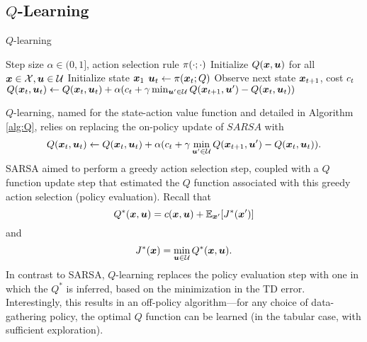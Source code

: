 \subsection{$Q$-Learning}

\begin{algorithm}[t]
\caption{$Q$-learning}
\centering
\label{alg:Q}

\begin{algorithmic}[1]
    \Require Step size $\alpha \in (0,1]$, action selection rule $\pi(\cdot; \cdot)$
    \State Initialize $Q(\bm{x},\bm{u})$ for all $\bm{x} \in \mathcal{X}, \bm{u} \in \mathcal{U}$
        \State Initialize state $\bm{x}_1$
            \State $\bm{u}_t \gets \pi(\bm{x}_t; Q)$
            \State Observe next state $\bm{x}_{t+1}$, cost $c_{t}$
            \State $Q(\bm{x}_t,\bm{u}_t) \gets Q(\bm{x}_t,\bm{u}_t) + \alpha (c_t + \gamma \min_{\bm{u}' \in \mathcal{U}} Q(\bm{x}_{t+1},\bm{u}') - Q(\bm{x}_t,\bm{u}_t))$
        \EndFor
    \EndFor
\end{algorithmic}
\end{algorithm}

$Q$-learning, named for the state-action value function and detailed in Algorithm \ref{alg:Q}, relies on replacing the on-policy update of $SARSA$ with 
\begin{equation}
    Q(\bm{x}_t,\bm{u}_t) \gets Q(\bm{x}_t,\bm{u}_t) + \alpha (c_t + \gamma \min_{\bm{u}' \in \mathcal{U}} Q(\bm{x}_{t+1},\bm{u}') - Q(\bm{x}_t,\bm{u}_t)).
\end{equation}
SARSA aimed to perform a greedy action selection step, coupled with a $Q$ function update step that estimated the $Q$ function associated with this greedy action selection (policy evaluation). Recall that
\begin{equation}
    Q^*(\bm{x},\bm{u}) = c(\bm{x},\bm{u}) + \mathbb{E}_{\bm{x}'}[J^*(\bm{x}')]
\end{equation}
and
\begin{equation}
    J^*(\bm{x}) = \min_{\bm{u} \in \mathcal{U}} Q^*(\bm{x},\bm{u}).
\end{equation}
In contrast to SARSA, $Q$-learning replaces the policy evaluation step with one in which the $Q^*$ is inferred, based on the minimization in the TD error. Interestingly, this results in an off-policy algorithm---for any choice of data-gathering policy, the optimal $Q$ function can be learned (in the tabular case, with sufficient exploration). 


